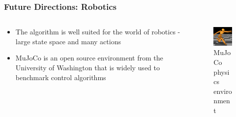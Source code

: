 \documentclass{beamer}
\begin{document}
\begin{frame}
  \frametitle{Future Directions: Robotics}

  \begin{columns}[T]
    \begin{column}{.48\textwidth}
      \begin{itemize}
        \item The algorithm is well suited for the world of robotics - large state space and many actions
        \item MuJoCo is an open source environment from the University of Washington that is widely used to benchmark control algorithms
      \end{itemize}
    \end{column}
    \hfill
    \begin{column}{.48\textwidth}
      \begin{figure}
        \includegraphics[width=0.5\linewidth]{./images/mujoco.png}
        \caption{MuJoCo physics environment}
      \end{figure}
    \end{column}
  \end{columns}
\end{frame}


\end{document}
